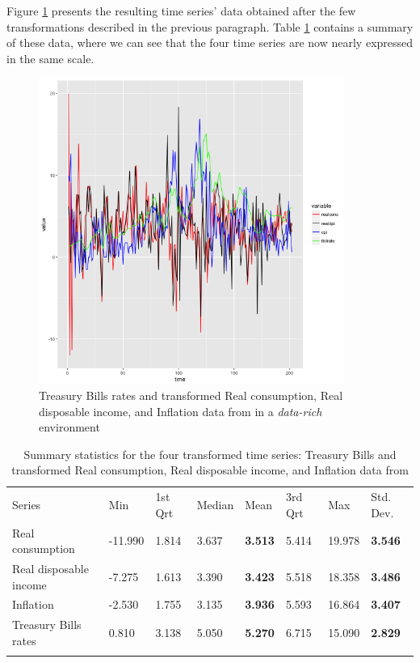 Figure \ref{all_series_plot} presents the resulting time series' data obtained after the few transformations described in the previous paragraph. Table \ref{tab:summary_four_ts} contains a summary of these data, where we can see that the four time series are now nearly expressed in the same scale.

\begin{figure}[!htb]
\centering
\includegraphics[width=10cm]{gfx/chapter-rvfl-ensembles/all_series.png}
\caption{Treasury Bills rates and transformed Real consumption, Real disposable income, and  Inflation data from \cite{greene2003econometric} in a \textit{data-rich} environment}
\label{all_series_plot}
\end{figure}


\begin{table}[!htb]
\begin{center}
\caption{Summary statistics for the four transformed time series: Treasury Bills and transformed Real consumption, Real disposable income, and  Inflation data from \cite{greene2003econometric}}
\label{tab:summary_four_ts}       %
\begin{tabular}{llllllll}
\hline\noalign{\smallskip}
Series & Min & 1st Qrt  & Median  & Mean & 3rd Qrt  & Max & Std. Dev.\\
\noalign{\smallskip}\hline\noalign{\smallskip}
  Real consumption  & -11.990 & 1.814 & 3.637 & \textbf{3.513} & 5.414 & 19.978 & \textbf{3.546}\\
  Real disposable income  & -7.275 & 1.613 & 3.390 & \textbf{3.423} & 5.518 & 18.358 & \textbf{3.486}\\
  Inflation & -2.530  & 1.755 & 3.135 & \textbf{3.936} & 5.593 & 16.864 & \textbf{3.407}\\
  Treasury Bills rates & 0.810  & 3.138 & 5.050 & \textbf{5.270} & 6.715 & 15.090 & \textbf{2.829} \\
\noalign{\smallskip}\hline
\end{tabular}
\end{center}
\end{table}


